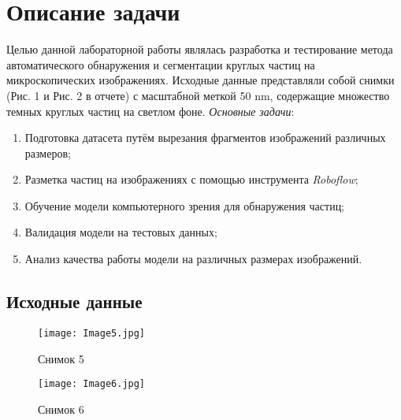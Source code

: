\documentclass[12pt, a4paper]{report}
\begin{document}
	\section*{Описание задачи}
	\large
	Целью данной лабораторной работы являлась разработка и тестирование метода автоматического обнаружения и сегментации круглых частиц на микроскопических изображениях. Исходные данные представляли собой снимки (Рис. 1 и Рис. 2 в отчете) с масштабной меткой 50 nm, содержащие множество темных круглых частиц на светлом фоне.
	\textit{Основные задачи}:
	\begin{enumerate}
		\item Подготовка датасета путём вырезания фрагментов изображений различных размеров;
		\item Разметка частиц на изображениях с помощью инструмента \textit{Roboflow};
		\item Обучение модели компьютерного зрения для обнаружения частиц;
		\item Валидация модели на тестовых данных;
		\item Анализ качества работы модели на различных размерах изображений.
	\end{enumerate}

	\subsection*{Исходные данные}
	\large
	\begin{figure}[h]
		\texttt{[image: Image5.jpg]}
		\caption{Снимок 5}
	\end{figure}
	\begin{figure}[h]
		\texttt{[image: Image6.jpg]}
		\caption{Снимок 6}
	\end{figure}

	\newpage
\end{document}
